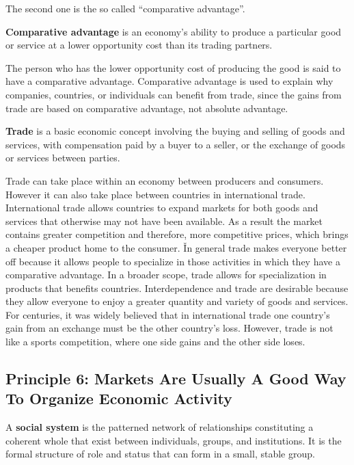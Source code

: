 The second one is the so called ``comparative advantage''.

\textbf{Comparative advantage} is an economy's ability to produce a particular good or service at a lower opportunity
cost than its trading partners.
\ed

The person who has the lower opportunity cost of producing the good is said to have a comparative advantage.
Comparative advantage is used to explain why companies, countries, or individuals can benefit from trade, since the
gains from trade are based on comparative advantage, not absolute advantage.

\bd[Trade]
\textbf{Trade} is a basic economic concept involving the buying and selling of goods and services, with compensation
paid by a buyer to a seller, or the exchange of goods or services between parties.
\ed

Trade can take place within an economy between producers and consumers. However it can also take place between
countries in international trade. International trade allows countries to expand markets for both goods and services
that otherwise may not have been available. As a result the market contains greater competition and therefore, more
competitive prices, which brings a cheaper product home to the consumer. \v

In general trade makes everyone better off because it allows people to specialize in those activities in which they
have a comparative advantage. In a broader scope, trade allows for specialization in products that benefits countries.
Interdependence and trade are desirable because they allow everyone to enjoy a greater quantity and variety of
goods and services. For centuries, it was widely believed that in international trade one country's gain from an
exchange must be the other country's loss. However, trade is not like a sports competition, where one side gains and
the other side loses.

\subsection*{Principle 6: Markets Are Usually A Good Way To Organize Economic Activity}

A \textbf{social system} is the patterned network of relationships constituting a coherent whole that exist between
individuals, groups, and institutions. It is the formal structure of role and status that can form in a small, stable
group.
\ed

